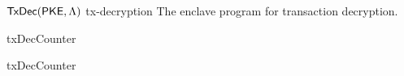 \begin{cccProgram}
	{$\mathsf{TxDec}(\mathsf{PKE}, \Lambda)$}
	{tx-decryption}
	{The enclave program for transaction decryption.}

	\begin{minipage}[t]{.49\textwidth}
		\begin{algorithmWithNumbering}{txDecCounter}
			
			\EndIf
			
		\end{algorithmWithNumbering}
	\end{minipage}
	\begin{minipage}[t]{.49\textwidth}
		\begin{algorithmWithNumbering}{txDecCounter}
			
			
			
			
			
		\end{algorithmWithNumbering}
	\end{minipage}
\end{cccProgram}
